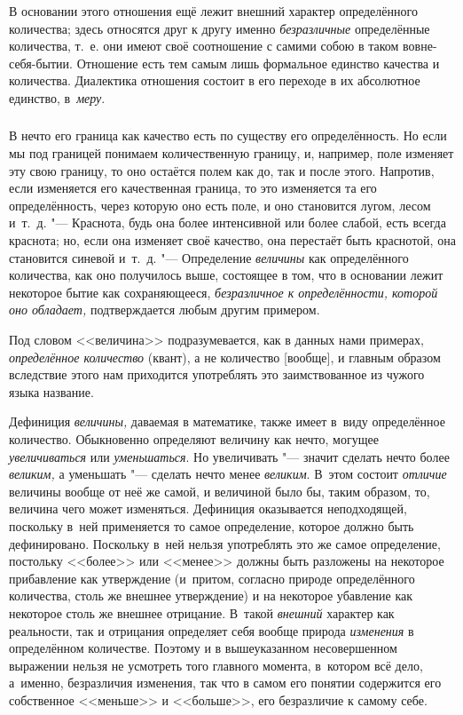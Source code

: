 В основании этого отношения ещё лежит внешний характер определённого
количества; здесь относятся друг к другу именно {\em безразличные}
определённые количества, т.~е. они имеют своё соотношение
с самими собою в таком вовне-себя-бытии.
Отношение есть тем самым лишь формальное единство качества
и количества. Диалектика отношения состоит в его переходе в их абсолютное
единство, в~{\em меру}.

\subsubsection[Примечание]{}

В нечто его граница как качество есть по существу его определённость. Но если
мы под границей понимаем количественную границу, и, например, поле изменяет эту
свою границу, то оно остаётся полем как до, так и после этого. Напротив, если
изменяется его качественная граница, то это изменяется та его определённость,
через которую оно есть поле, и оно становится лугом, лесом и~т.~д. "---
Краснота, будь она более интенсивной или более слабой, есть всегда краснота;
но, если она изменяет своё качество, она перестаёт быть краснотой, она
становится синевой и~т.~д. "--- Определение {\em величины} как определённого
количества, как оно получилось выше, состоящее в том, что в основании лежит
некоторое бытие как сохраняющееся, {\em безразличное к определённости, которой
оно обладает,} подтверждается любым другим примером.

Под словом <<величина>> подразумевается, как в данных нами примерах,
{\em определённое количество} (квант), а не количество [вообще], и главным
образом вследствие этого нам приходится употреблять это заимствованное из
чужого языка название.

Дефиниция {\em величины,} даваемая в математике, также имеет в~виду
определённое количество. Обыкновенно определяют величину как нечто, могущее
{\em увеличиваться} или {\em уменьшаться}. Но увеличивать "--- значит сделать
нечто более {\em великим,} а уменьшать "--- сделать нечто менее {\em великим}.
В~этом состоит {\em отличие} величины вообще от неё же самой, и величиной было
бы, таким образом, то, величина чего может изменяться. Дефиниция оказывается
неподходящей, поскольку в~ней применяется то самое определение, которое должно
быть дефинировано. Поскольку в~ней нельзя употреблять это же самое определение,
постольку <<более>> или <<менее>> должны быть разложены на некоторое
прибавление как утверждение (и~притом, согласно природе определённого
количества, столь же внешнее утверждение) и на некоторое убавление как
некоторое столь же внешнее отрицание. В~такой {\em внешний} характер как
реальности, так и отрицания определяет себя вообще природа {\em изменения}
в определённом количестве. Поэтому и в вышеуказанном несовершенном выражении
нельзя не усмотреть того главного момента, в~котором всё дело, а~именно,
безразличия изменения, так что в самом его понятии содержится его собственное
<<меньше>> и <<больше>>, его безразличие к самому себе.

